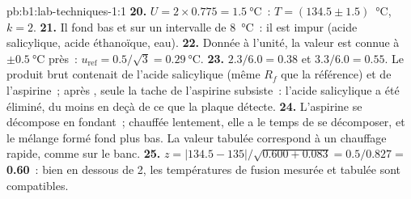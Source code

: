 \begin{solution}{pb:b1:lab-techniques-1:1}
\textbf{20.} $U = 2 \times 0.775 = \qty{1.5}{\celsius}$~:
$T = (134.5 \pm 1.5)$~\unit{\celsius}, $k = 2$.
\textbf{21.} Il fond bas et sur un intervalle de \qty{8}{\celsius}~: il
est impur (acide salicylique, acide éthanoïque, eau).
\textbf{22.} Donnée à l'unité, la valeur est connue à $\pm\qty{0.5}{\celsius}$ près~:
$u_{\mathrm{ref}} = 0.5/\sqrt3 = \qty{0.29}{\celsius}$.
\textbf{23.} $2.3/6.0 = 0.38$ et $3.3/6.0 = 0.55$. Le produit brut
contenait de l'acide salicylique (même $R_f$ que la référence) et de
l'aspirine~; après , seule la tache de l'aspirine
subsiste~: l'acide salicylique a été éliminé, du moins en deçà de ce que
la plaque détecte.
\textbf{24.} L'aspirine se décompose en fondant~; chauffée lentement,
elle a le temps de se décomposer, et le mélange formé fond plus bas. La
valeur tabulée correspond à un chauffage rapide, comme sur le banc.
\textbf{25.} $z = |134.5 - 135|/\sqrt{0.600 + 0.083} = 0.5/0.827 =$
\textbf{0.60}~: bien en dessous de 2, les températures de fusion
mesurée et tabulée sont compatibles.
\end{solution}
